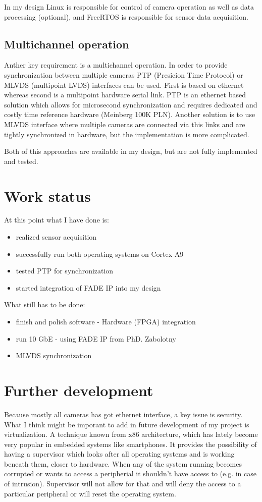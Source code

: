 \documentclass[10pt,a4paper]{article}
\begin{document}
In my design Linux is responsible for control of camera operation as well as data processing (optional), and FreeRTOS is responsible for sensor data acquisition. 



\subsection{Multichannel operation}
Anther key requirement is a multichannel operation. In order to provide synchronization between multiple cameras PTP (Presicion Time Protocol) or MLVDS (multipoint LVDS) interfaces can be used. First is based on ethernet whereas second is a multipoint hardware serial link. PTP is an ethernet based solution which allows for microsecond synchronization and requires dedicated and costly time reference hardware (Meinberg 100K PLN). Another solution is to use MLVDS interface where multiple cameras are connected via this links and are tightly synchronized in hardware, but the implementation is more complicated.

Both of this approaches are available in my design, but are not fully implemented and tested. 


\section{Work status}
At this point what I have done is:
\begin{itemize}
\item realized sensor acquisition
\item successfully run both operating systems on Cortex A9
\item tested PTP for synchronization
\item started integration of FADE IP into my design
\end{itemize}

What still has to be done:
\begin{itemize}
\item  finish and polish software - Hardware (FPGA) integration
\item  run 10 GbE - using FADE IP from PhD. Zabolotny
\item MLVDS synchronization
\end{itemize}

\section{Further development}
Because mostly all cameras has got ethernet interface, a key issue is security. What I think might be imporant to add in future development of my project is virtualization. A technique known from x86 architecture, which has lately become very popular in embedded systems like smartphones. It provides the possibility of having a supervisor which looks after all operating systems and is working beneath them, closer to hardware. When any of the system running becomes corrupted or wants to access a peripherial it shouldn't have access to (e.g. in case of intrusion). Supervisor will not allow for that and will deny the access to a particular peripheral or will reset the operating system. 
\end{document}
